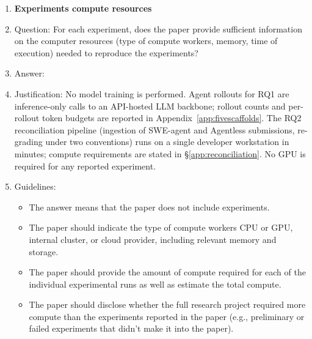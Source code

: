 \begin{enumerate}
\item {\bf Experiments compute resources}
    \item[] Question: For each experiment, does the paper provide sufficient information on the computer resources (type of compute workers, memory, time of execution) needed to reproduce the experiments?
    \item[] Answer: \answerYes{}
    \item[] Justification: No model training is performed. Agent rollouts for RQ1 are inference-only calls to an API-hosted LLM backbone; rollout counts and per-rollout token budgets are reported in Appendix~\ref{app:fivescaffolds}. The RQ2 reconciliation pipeline (ingestion of SWE-agent and Agentless submissions, re-grading under two conventions) runs on a single developer workstation in minutes; compute requirements are stated in \S\ref{app:reconciliation}. No GPU is required for any reported experiment.
    \item[] Guidelines:
    \begin{itemize}
        \item The answer \answerNA{} means that the paper does not include experiments.
        \item The paper should indicate the type of compute workers CPU or GPU, internal cluster, or cloud provider, including relevant memory and storage.
        \item The paper should provide the amount of compute required for each of the individual experimental runs as well as estimate the total compute.
        \item The paper should disclose whether the full research project required more compute than the experiments reported in the paper (e.g., preliminary or failed experiments that didn't make it into the paper).
    \end{itemize}


\end{enumerate}
